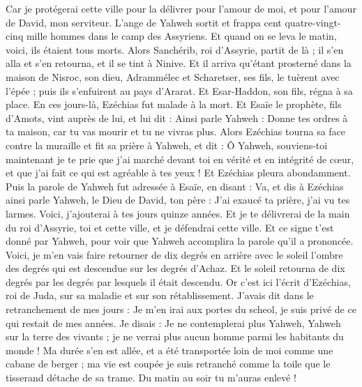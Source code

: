 \begin{multicols}{2}
Car je protégerai cette ville pour la délivrer pour l'amour de moi, et pour l'amour de David, mon serviteur.
L'ange de Yahweh sortit et frappa cent quatre-vingt-cinq mille hommes dans le camp des Assyriens. Et quand on se leva le matin, voici, ils étaient tous morts.
Alors Sanchérib, roi d'Assyrie, partit de là ; il s'en alla et s'en retourna, et il se tint à Ninive.
Et il arriva qu'étant prosterné dans la maison de Nisroc, son dieu, Adrammélec et Scharetser, ses fils, le tuèrent avec l'épée ; puis ils s'enfuirent au pays d'Ararat. Et Esar-Haddon, son fils, régna à sa place.
\VerseOne{}En ces jours-là, Ezéchias fut malade à la mort. Et Esaïe le prophète, fils d'Amots, vint auprès de lui, et lui dit : Ainsi parle Yahweh : Donne tes ordres à ta maison, car tu vas mourir et tu ne vivras plus.
Alors Ezéchias tourna sa face contre la muraille et fit sa prière à Yahweh,
et dit : Ô Yahweh, souviens-toi maintenant je te prie que j'ai marché devant toi en vérité et en intégrité de cœur, et que j'ai fait ce qui est agréable à tes yeux ! Et Ezéchias pleura abondamment.
Puis la parole de Yahweh fut adressée à Esaïe, en disant :
Va, et dis à Ezéchias ainsi parle Yahweh, le Dieu de David, ton père : J'ai exaucé ta prière, j'ai vu tes larmes. Voici, j'ajouterai à tes jours quinze années.
Et je te délivrerai de la main du roi d'Assyrie, toi et cette ville, et je défendrai cette ville.
Et ce signe t'est donné par Yahweh, pour voir que Yahweh accomplira la parole qu'il a prononcée.
Voici, je m'en vais faire retourner de dix degrés en arrière avec le soleil l'ombre des degrés qui est descendue sur les degrés d'Achaz. Et le soleil retourna de dix degrés par les degrés par lesquels il était descendu.
Or c'est ici l'écrit d'Ezéchias, roi de Juda, sur sa maladie et sur son rétablissement.
J'avais dit dans le retranchement de mes jours : Je m'en irai aux portes du scheol, je suis privé de ce qui restait de mes années.
Je disais : Je ne contemplerai plus Yahweh, Yahweh sur la terre des vivants ; je ne verrai plus aucun homme parmi les habitants du monde !
Ma durée s'en est allée, et a été transportée loin de moi comme une cabane de berger ; ma vie est coupée je suis retranché comme la toile que le tisserand détache de sa trame. Du matin au soir tu m'auras enlevé !

\end{multicols}
